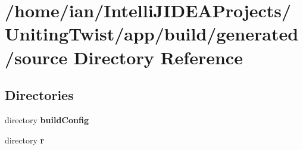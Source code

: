 \section{/home/ian/\+Intelli\+J\+I\+D\+E\+A\+Projects/\+Uniting\+Twist/app/build/generated/source Directory Reference}
\label{dir_eeeb09d1b939f88d09d32bbd34f5662c}
\subsection*{Directories}
\begin{DoxyCompactItemize}
\item 
directory \textbf{ build\+Config}
\item 
directory \textbf{ r}
\end{DoxyCompactItemize}
